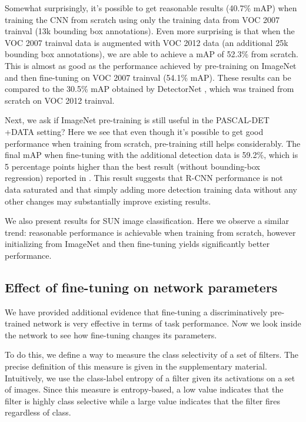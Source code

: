 Somewhat surprisingly, it's possible to get reasonable results (40.7\% mAP) when training the CNN from scratch using only the training data from VOC 2007 trainval (13k bounding box annotations).
Even more surprising is that when the VOC 2007 trainval data is augmented with VOC 2012 data (an additional 25k bounding box annotations), we are able to achieve a mAP of 52.3\% from scratch.
This is almost as good as the performance achieved by pre-training on ImageNet and then fine-tuning on VOC 2007 trainval (54.1\% mAP).
These results can be compared to the 30.5\% mAP obtained by DetectorNet \cite{DetectorNet}, which was trained from scratch on VOC 2012 trainval.

Next, we ask if ImageNet pre-training is still useful in the PASCAL-DET +DATA setting?
Here we see that even though it's possible to get good performance when training from scratch, pre-training still helps considerably.
The final mAP when fine-tuning with the additional detection data is 59.2\%, which is 5 percentage points higher than the best result (without bounding-box regression) reported in \cite{Rcnn}.
This result suggests that R-CNN performance is not data saturated and that simply adding more detection training data without any other changes may substantially improve existing results.

We also present results for SUN image classification.
Here we observe a similar trend: reasonable performance is achievable when training from scratch, however initializing from ImageNet and then fine-tuning yields significantly better performance.

\subsection{Effect of fine-tuning on network parameters}
\label{sub:fine-entropy}
We have provided additional evidence that fine-tuning a discriminatively pre-trained network is very effective in terms of task performance.
Now we look inside the network to see how fine-tuning changes its parameters.

To do this, we define a way to measure the class selectivity of a set of filters.
The precise definition of this measure is given in the supplementary material.
Intuitively, we use the class-label entropy of a filter given its activations on a set of images.
Since this measure is entropy-based, a low value indicates that the filter is highly class selective while a large value indicates that the filter fires regardless of class.

